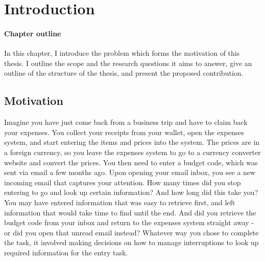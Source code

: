 \chapter{Introduction}

\begin{mynote}
\subsubsection{Chapter outline}
In this chapter, I introduce the problem which forms the motivation of this thesis. I outline the scope and the research questions it aims to answer, give an outline of the structure of the thesis, and present the proposed contribution.
\end{mynote}

\vspace{10pt}

\section{Motivation}

Imagine you have just come back from a business trip and have to claim back your expenses. You collect your receipts from your wallet, open the expenses system, and start entering the items and prices into the system. The prices are in a foreign currency, so you leave the expenses system to go to a currency converter website and convert the prices. You then need to enter a budget code, which was sent via email a few months ago. Upon opening your email inbox, you see a new incoming email that captures your attention. How many times did you stop entering to go and look up certain information? And how long did this take you? You may have entered information that was easy to retrieve first, and left information that would take time to find until the end. And did you retrieve the budget code from your inbox and return to the expenses system straight away - or did you open that unread email instead? Whatever way you chose to complete the task, it involved making decisions on how to manage interruptions to look up required information for the entry task. 

